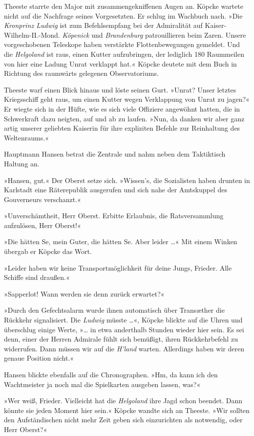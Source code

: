 Theeste starrte den Major mit zusammengekniffenen Augen an. Köpcke
wartete nicht auf die Nachfrage seines Vorgesetzten. Er schlug im
Wachbuch nach. »Die \emph{Kronprinz Ludwig} ist zum Befehlsempfang
bei der Admiralität auf Kaiser-Wilhelm-II.-Mond. \emph{Köpenick}
und \emph{Brandenburg} patrouillieren beim Zaren. Unsere
vorgeschobenen Teleskope haben verstärkte Flottenbewegungen
gemeldet. Und die \emph{Helgoland} ist raus, einen Kutter
aufzubringen, der lediglich 180 Raummeilen von hier eine Ladung
Unrat verklappt hat.« Köpcke deutete mit dem Buch in Richtung des
raumwärts gelegenen Observatoriums.

Theeste warf einen Blick hinaus und löste seinen Gurt. »Unrat?
Unser letztes Kriegsschiff geht raus, um einen Kutter wegen
Verklappung von Unrat zu jagen?« Er wiegte sich in der Hüfte, wie
es sich viele Offiziere angewöhnt hatten, die in Schwerkraft dazu
neigten, auf und ab zu laufen. »Nun, da danken wir aber ganz artig
unserer geliebten Kaiserin für ihre expliziten Befehle zur
Reinhaltung des Weltenraums.«

Hauptmann Hansen betrat die Zentrale und nahm neben dem Taktiktisch
Haltung an.

»Hansen, gut.« Der Oberst setze sich. »Wissen's, die Sozialisten
haben drunten in Karlstadt eine Räterepublik ausgerufen und sich
nahe der Amtskuppel des Gouverneurs verschanzt.«

»Unverschämtheit, Herr Oberst. Erbitte Erlaubnis, die
Ratsversammlung aufzulösen, Herr Oberst!«

»Die hätten Se, mein Guter, die hätten Se. Aber leider …« Mit einem
Winken übergab er Köpcke das Wort.

»Leider haben wir keine Transportmöglichkeit für deine Jungs,
Frieder. Alle Schiffe sind draußen.«

»Sapperlot! Wann werden sie denn zurück erwartet?«

»Durch den Gefechtsalarm wurde ihnen automatisch über Transæther
die Rückkehr signalisiert. Die \emph{Ludwig} müsste …«, Köpcke
blickte auf die Uhren und überschlug einige Werte, »… in etwa
anderthalb Stunden wieder hier sein. Es sei denn, einer der Herren
Admirale fühlt sich bemüßigt, ihren Rückkehrbefehl zu widerrufen.
Dann müssen wir auf die \emph{H'land} warten. Allerdings haben wir
deren genaue Position nicht.«

Hansen blickte ebenfalls auf die Chronographen. »Hm, da kann ich
den Wachtmeister ja noch mal die Spielkarten ausgeben lassen,
was?«

»Wer weiß, Frieder. Vielleicht hat die \emph{Helgoland} ihre Jagd
schon beendet. Dann könnte sie jeden Moment hier sein.« Köpcke
wandte sich an Theeste. »Wir sollten den Aufständischen nicht mehr
Zeit geben sich einzurichten als notwendig, oder Herr Oberst?«

